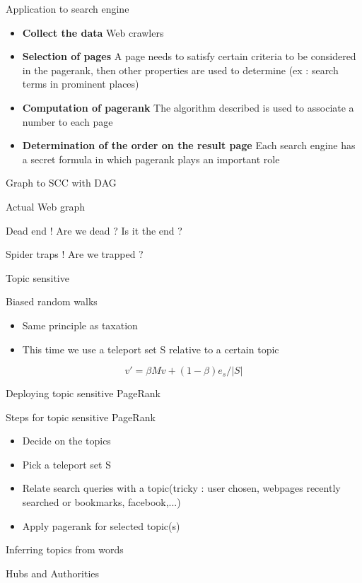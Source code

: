 \documentclass[10pt]{beamer}
\begin{document}
\begin{frame}{Application to search engine}
\begin{itemize}
\item \textbf{Collect the data} Web crawlers
\item \textbf{Selection of pages} A page needs to satisfy certain criteria to be considered in the pagerank, then other properties are used to determine (ex : search terms in prominent places)
\item \textbf{Computation of pagerank} The algorithm described is used to associate a number to each page
\item \textbf{Determination of the order on the result page} Each search engine has a secret formula in which pagerank plays an important role
\end{itemize}
\end{frame}
\begin{frame}{Graph to SCC with DAG}
\end{frame}

\begin{frame}{Actual Web graph}
\end{frame}

\begin{frame}{Dead end ! Are we dead ? Is it the end ?}
\end{frame}

\begin{frame}{Spider traps ! Are we trapped ?}
\end{frame}

\begin{frame}{Topic sensitive}
  \begin{block}{Biased random walks}
  \begin{itemize}
  \item Same principle as taxation
  \item This time we use a teleport set S relative to a certain topic
  \end{itemize}
  $$ v' = \beta Mv + (1-\beta)e_s/|S|$$
  \end{block}
\end{frame}
\begin{frame}{Deploying topic sensitive PageRank}
\begin{block}{Steps for topic sensitive PageRank}
\begin{itemize}
\item Decide on the topics
\item Pick a teleport set S
\item Relate search queries with a topic(tricky : user chosen, webpages recently searched or bookmarks, facebook,...)
\item Apply pagerank for selected topic(s)
\end{itemize}
\end{block}
\end{frame}
\begin{frame}{Inferring topics from words}

\end{frame}
\begin{frame}{Hubs and Authorities}
\end{frame}
\end{document}
